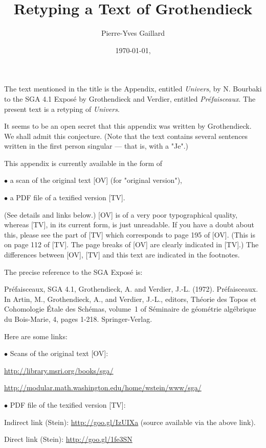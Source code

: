 \documentclass[12pt]{article}
\title{Retyping a Text of Grothendieck}
\author{Pierre-Yves Gaillard}
\date{\today, \currenttime}
\newcommand{\nn}{\noindent}
\begin{document}
\maketitle

\nn The text mentioned in the title is the Appendix, entitled \emph{Univers}, by N. Bourbaki to the SGA 4.1 Exposé by Grothendieck and Verdier, entitled \emph{Préfaisceaux}. The present text is a retyping of \emph{Univers}.

It seems to be an open secret that this appendix was written by Grothendieck. We shall admit this conjecture. (Note that the text contains several sentences written in the first person singular --- that is, with a "Je".)

This appendix is currently available in the form of 

$\bullet$ a scan of the original text [OV] (for "original version"),  

$\bullet$ a PDF file of a texified version [TV]. 

\nn(See details and links below.) [OV] is of a very poor typographical quality, whereas [TV], in its current form, is just unreadable. If you have a doubt about this, please see the part of [TV] which corresponds to page 195 of [OV]. (This is on page 112 of [TV]. The page breaks of [OV] are clearly indicated in [TV].) The differences between [OV], [TV] and this text are indicated in the footnotes.

The precise reference to the SGA Exposé is:

\nn Préfaisceaux, SGA 4.1, Grothendieck, A. and Verdier, J.-L. (1972). Préfaisceaux. In Artin, M., Grothendieck, A., and Verdier, J.-L., editors, Théorie des Topos et Cohomologie \'Etale des Schémas, volume~1 of Séminaire de géométrie algébrique du Bois-Marie, 4, pages 1-218. Springer-Verlag.

Here are some links:

\nn$\bullet$ Scans of the original text [OV]: 

\nn\href{http://library.msri.org/books/sga/}{http://library.msri.org/books/sga/}

\nn\href{http://modular.math.washington.edu/home/wstein/www/sga/}{http://modular.math.washington.edu/home/wstein/www/sga/} 

\nn$\bullet$ PDF file of the texified version [TV]:

\nn Indirect link (Stein): \href{http://goo.gl/IzUIXa}{http://goo.gl/IzUIXa} (source available via the above link).

\nn Direct link (Stein): \href{http://goo.gl/1fe3SN}{http://goo.gl/1fe3SN}
\end{document}
